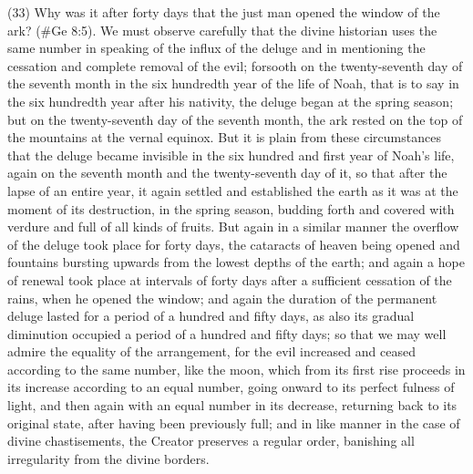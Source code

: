 (33) Why was it after forty days that the just man opened the window of the ark? (\#Ge 8:5).
We must observe carefully that the divine historian uses the same number in speaking of the influx
of the deluge and in mentioning the cessation and complete removal of the evil; forsooth on the
twenty-seventh day of the seventh month in the six hundredth year of the life of Noah, that is to say
in the six hundredth year after his nativity, the deluge began at the spring season; but on the
twenty-seventh day of the seventh month, the ark rested on the top of the mountains at the vernal
equinox. But it is plain from these circumstances that the deluge became invisible in the six
hundred and first year of Noah's life, again on the seventh month and the twenty-seventh day of it,
so that after the lapse of an entire year, it again settled and established the earth as it was at the
moment of its destruction, in the spring season, budding forth and covered with verdure and full of
all kinds of fruits. But again in a similar manner the overflow of the deluge took place for forty days,
the cataracts of heaven being opened and fountains bursting upwards from the lowest depths of
the earth; and again a hope of renewal took place at intervals of forty days after a sufficient
cessation of the rains, when he opened the window; and again the duration of the permanent
deluge lasted for a period of a hundred and fifty days, as also its gradual diminution occupied a
period of a hundred and fifty days; so that we may well admire the equality of the arrangement, for
the evil increased and ceased according to the same number, like the moon, which from its first
rise proceeds in its increase according to an equal number, going onward to its perfect fulness of
light, and then again with an equal number in its decrease, returning back to its original state, after
having been previously full; and in like manner in the case of divine chastisements, the Creator
preserves a regular order, banishing all irregularity from the divine borders.

